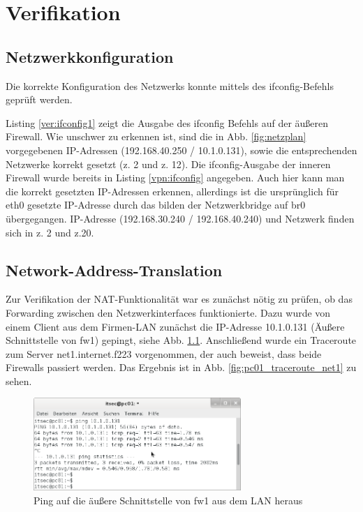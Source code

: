 \chapter{Verifikation}
\section{Netzwerkkonfiguration}
Die korrekte Konfiguration des Netzwerks konnte mittels des ifconfig-Befehls geprüft werden.



Listing \ref{ver:ifconfig1} zeigt die Ausgabe des ifconfig Befehls auf der äußeren Firewall. Wie unschwer zu erkennen ist, sind die in Abb. \ref{fig:netzplan} vorgegebenen IP-Adressen (192.168.40.250 / 10.1.0.131), sowie die entsprechenden Netzwerke korrekt gesetzt (z. 2 und z. 12). Die ifconfig-Ausgabe der inneren Firewall wurde bereits in Listing \ref{vpn:ifconfig} angegeben. Auch hier kann man die korrekt gesetzten IP-Adressen erkennen, allerdings ist die ursprünglich für eth0 gesetzte IP-Adresse durch das bilden der Netzwerkbridge auf br0 übergegangen. IP-Adresse (192.168.30.240 / 192.168.40.240) und Netzwerk finden sich in z. 2 und z.20.


\section{Network-Address-Translation}
Zur Verifikation der NAT-Funktionalität war es zunächst nötig zu prüfen, ob das Forwarding zwischen den Netzwerkinterfaces funktionierte. Dazu wurde von einem Client aus dem Firmen-LAN zunächst die IP-Adresse 10.1.0.131 (Äußere Schnittstelle von fw1) gepingt, siehe Abb. \ref{fig:pc01_ping_fw1}. Anschließend wurde ein Traceroute zum Server net1.internet.f223 vorgenommen, der auch beweist, dass beide Firewalls passiert werden. Das Ergebnis ist in Abb. \ref{fig:pc01_traceroute_net1} zu sehen.

\begin{figure}[h!]
	\centering
		\includegraphics[width=0.7\textwidth]{figures/pc01_ping_fw1.png}
	\caption{Ping auf die äußere Schnittstelle von fw1 aus dem LAN heraus}
	\label{fig:pc01_ping_fw1}
\end{figure}


